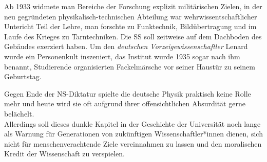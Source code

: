 Ab 1933 widmete man Bereiche der Forschung explizit militärischen Zielen, in der neu gegründeten physikalisch-technischen Abteilung war wehrwissentschaftlicher Untericht Teil der Lehre, man forschte zu Funktechnik, Bildübertragung und im Laufe des Krieges zu Tarntechniken. Die SS soll zeitweise auf dem Dachboden des Gebäudes exerziert haben.
Um den \textit{deutschen Vorzeigewissenschaftler} Lenard wurde ein Personenkult inszeniert, das Institut wurde 1935 sogar nach ihm benannt, Studierende organisierten Fackelmärsche vor seiner Haustür zu seinem Geburtstag. 

Gegen Ende der NS-Diktatur spielte die deutsche Physik praktisch keine Rolle mehr und heute wird sie oft aufgrund ihrer offensichtlichen Absurdität gerne belächelt.\\ Allerdings soll dieses dunkle Kapitel in der Geschichte der Universität noch lange als Warnung für Generationen von zukünftigen Wissenschaftler*innen dienen, sich nicht für menschenverachtende Ziele vereinnahmen zu lassen und den moralischen Kredit der Wissenschaft zu verspielen.

